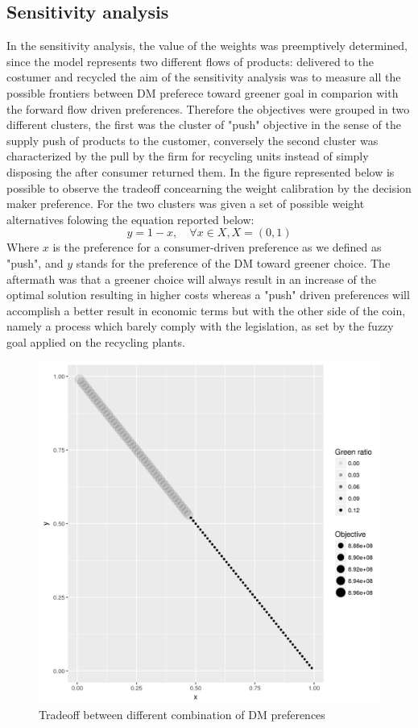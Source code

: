 \begin{doublespace}
\subsection{Sensitivity analysis}
In the sensitivity analysis, the value of the weights was preemptively determined, since the model represents two different flows of products: delivered to the costumer and recycled the aim of the sensitivity analysis was to measure all the possible frontiers between DM preferece toward greener goal in comparion with the forward flow driven preferences. Therefore the objectives were grouped in two different clusters, the first was the cluster of "push" objective in the sense of the supply push of products to the customer, conversely the second cluster was characterized by the pull by the firm for recycling units instead of simply disposing the after consumer returned them. In the figure represented below is possible to observe the tradeoff concearning the weight calibration by the decision maker preference.
For the two clusters was given a set of possible weight alternatives folowing the equation reported below:
$$
y=1-x, \quad \forall x \in X, X = (0,1)
$$
Where $x$ is the preference for a consumer-driven preference as we defined as "push", and $y$ stands for the preference of the DM toward greener choice.
The aftermath was that a greener choice will always result in an increase of the optimal solution resulting in higher costs whereas a "push" driven preferences will accomplish a better result in economic terms but with the other side of the coin, namely a process which barely comply with the legislation, as set by the fuzzy goal applied on the recycling plants.
\begin{figure}[h]
\centering
\includegraphics[width=0.7\linewidth]{Images/tradeoff.png}
\caption{Tradeoff between different combination of DM preferences}
\end{figure}


\end{doublespace}
